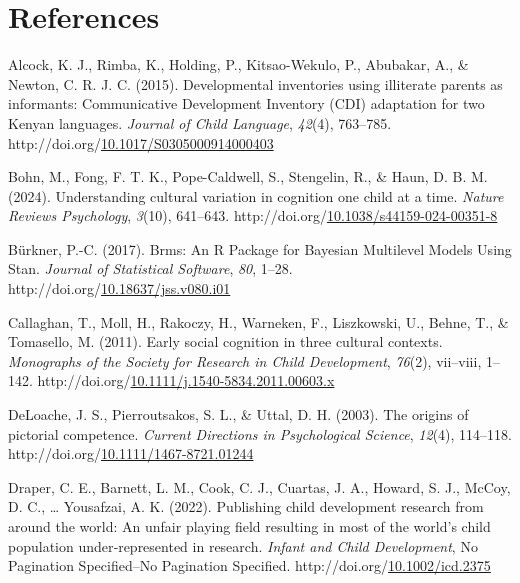 \documentclass[10pt, letterpaper]{article}
\begin{document}
\section{References}\label{references}

\setlength{\parindent}{-0.1in} 
\setlength{\leftskip}{0.125in}

\noindent

\label{refs}
\begin{CSLReferences}{1}{0}
Alcock, K. J., Rimba, K., Holding, P., Kitsao-Wekulo, P., Abubakar, A.,
\& Newton, C. R. J. C. (2015). Developmental inventories using
illiterate parents as informants: {Communicative} {Development}
{Inventory} ({CDI}) adaptation for two {Kenyan} languages. \emph{Journal
of Child Language}, \emph{42}(4), 763--785.
http://doi.org/\href{https://doi.org/10.1017/S0305000914000403}{10.1017/S0305000914000403}

Bohn, M., Fong, F. T. K., Pope-Caldwell, S., Stengelin, R., \& Haun, D.
B. M. (2024). Understanding cultural variation in cognition one child at
a time. \emph{Nature Reviews Psychology}, \emph{3}(10), 641--643.
http://doi.org/\href{https://doi.org/10.1038/s44159-024-00351-8}{10.1038/s44159-024-00351-8}

Bürkner, P.-C. (2017). Brms: {An} {R} {Package} for {Bayesian}
{Multilevel} {Models} {Using} {Stan}. \emph{Journal of Statistical
Software}, \emph{80}, 1--28.
http://doi.org/\href{https://doi.org/10.18637/jss.v080.i01}{10.18637/jss.v080.i01}

Callaghan, T., Moll, H., Rakoczy, H., Warneken, F., Liszkowski, U.,
Behne, T., \& Tomasello, M. (2011). Early social cognition in three
cultural contexts. \emph{Monographs of the Society for Research in Child
Development}, \emph{76}(2), vii--viii, 1--142.
http://doi.org/\href{https://doi.org/10.1111/j.1540-5834.2011.00603.x}{10.1111/j.1540-5834.2011.00603.x}

DeLoache, J. S., Pierroutsakos, S. L., \& Uttal, D. H. (2003). The
origins of pictorial competence. \emph{Current Directions in
Psychological Science}, \emph{12}(4), 114--118.
http://doi.org/\href{https://doi.org/10.1111/1467-8721.01244}{10.1111/1467-8721.01244}

Draper, C. E., Barnett, L. M., Cook, C. J., Cuartas, J. A., Howard, S.
J., McCoy, D. C., \ldots{} Yousafzai, A. K. (2022). Publishing child
development research from around the world: {An} unfair playing field
resulting in most of the world's child population under‐represented in
research. \emph{Infant and Child Development}, No Pagination
Specified--No Pagination Specified.
http://doi.org/\href{https://doi.org/10.1002/icd.2375}{10.1002/icd.2375}


\end{CSLReferences}
\end{document}
